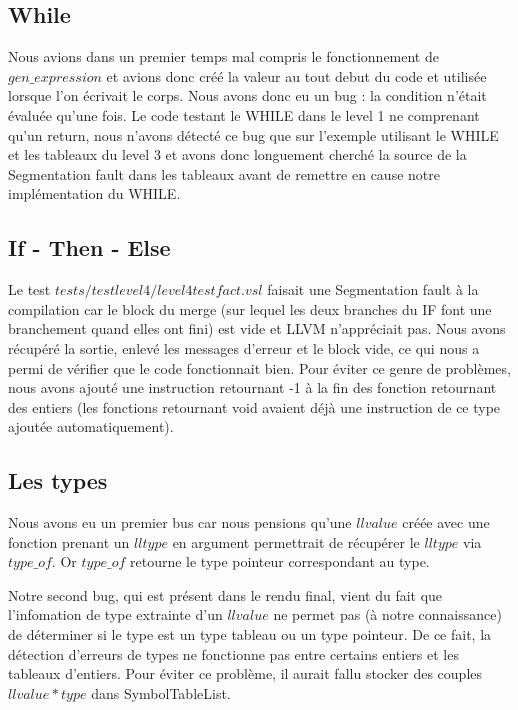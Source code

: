\documentclass[10pt,a4paper]{article}
\begin{document}
\subsection{While}

Nous avions dans un premier temps mal compris le fonctionnement de $gen\_expression$ et avions donc cr\'e\'e la valeur au tout debut du code et utilis\'ee lorsque l'on \'ecrivait le corps. Nous avons donc eu un bug : la condition n'\'etait \'evalu\'ee qu'une fois. Le code testant le WHILE dans le level 1 ne comprenant qu'un return, nous n'avons d\'etect\'e ce bug que sur l'exemple utilisant le WHILE et les tableaux du level 3 et avons donc longuement cherch\'e la source de la Segmentation fault dans les tableaux avant de remettre en cause notre impl\'ementation du WHILE. 

\subsection{If - Then - Else}

Le test $tests/testlevel4/level4testfact.vsl$ faisait une Segmentation fault \`a la compilation car le block du merge (sur lequel les deux branches du IF font une branchement quand elles ont fini) est vide et LLVM n'appr\'eciait pas. Nous avons r\'ecup\'er\'e la sortie, enlev\'e les messages d'erreur et le block vide, ce qui nous a permi de v\'erifier que le code fonctionnait bien. Pour \'eviter ce genre de probl\`emes, nous avons ajout\'e une instruction retournant -1 \`a la fin des fonction retournant des entiers (les fonctions retournant void avaient d\'ej\`a une instruction de ce type ajout\'ee automatiquement).


\subsection{Les types} 

Nous avons eu un premier bus car nous pensions qu'une $llvalue$ cr\'e\'ee avec une fonction prenant un $lltype$ en argument permettrait de r\'ecup\'erer le $lltype$ via $type\_of$. Or $type\_of$ retourne le type pointeur correspondant au type.

Notre second bug, qui est pr\'esent dans le rendu final, vient du fait que l'infomation de type extrainte d'un $llvalue$ ne permet pas (\`a notre connaissance) de d\'eterminer si le type est un type tableau ou un type pointeur. De ce fait, la d\'etection d'erreurs de types ne fonctionne pas entre certains entiers et les tableaux d'entiers. Pour \'eviter ce probl\`eme, il aurait fallu stocker des couples $llvalue * type$ dans SymbolTableList.
\end{document}
